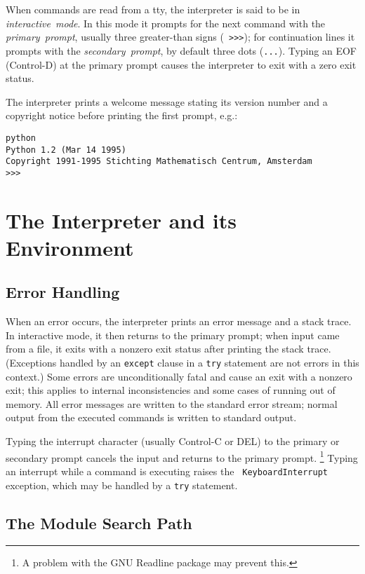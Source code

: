When commands are read from a tty, the interpreter is said to be in
{\em interactive\ mode}.  In this mode it prompts for the next command
with the {\em primary\ prompt}, usually three greater-than signs ({\tt
>>>}); for continuation lines it prompts with the {\em secondary\
prompt}, by default three dots ({\tt ...}).  Typing an EOF (Control-D)
at the primary prompt causes the interpreter to exit with a zero exit
status.

The interpreter prints a welcome message stating its version number
and a copyright notice before printing the first prompt, e.g.:

\bcode\begin{verbatim}
python
Python 1.2 (Mar 14 1995)
Copyright 1991-1995 Stichting Mathematisch Centrum, Amsterdam
>>>
\end{verbatim}\ecode

\section{The Interpreter and its Environment}

\subsection{Error Handling}

When an error occurs, the interpreter prints an error
message and a stack trace.  In interactive mode, it then returns to
the primary prompt; when input came from a file, it exits with a
nonzero exit status after printing
the stack trace.  (Exceptions handled by an {\tt except} clause in a
{\tt try} statement are not errors in this context.)  Some errors are
unconditionally fatal and cause an exit with a nonzero exit; this
applies to internal inconsistencies and some cases of running out of
memory.  All error messages are written to the standard error stream;
normal output from the executed commands is written to standard
output.

Typing the interrupt character (usually Control-C or DEL) to the
primary or secondary prompt cancels the input and returns to the
primary prompt.%
\footnote{
        A problem with the GNU Readline package may prevent this.
}
Typing an interrupt while a command is executing raises the {\tt
KeyboardInterrupt} exception, which may be handled by a {\tt try}
statement.

\subsection{The Module Search Path}

